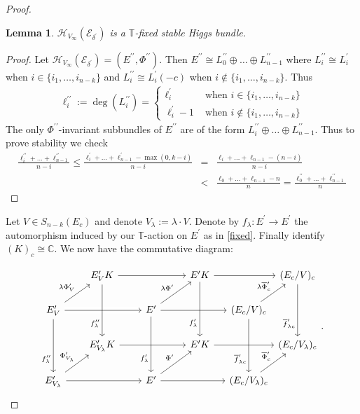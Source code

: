 \documentclass[12pt]{article}
\numberwithin{equation}{section}
\newtheorem{lemma}[theorem]{Lemma}
\theoremstyle{remark}
\theoremstyle{definition}
\numberwithin{theorem}{section}
\def\beq{\begin{eqnarray}}
\def\eeq{\end{eqnarray}}
\def\bes{\begin{eqnarray*}}
\def\ees{\end{eqnarray*}}
\def\calE{{\mathcal E}}
\def\C{\mathbb{C}}
\def\calH{\mathcal{H}}
\newcommand{\T}{{\mathbb{T}}}
\def\d{{{\delta}}}
\renewcommand{\1}{\mathbbm{1}}
\begin{document}
\begin{proof}
	\begin{lemma} $\calH_{V_\infty}(\calE_{\d^\prime})$ is a $\T$-fixed stable Higgs bundle. 
	\end{lemma}
	\begin{proof} Let $\calH_{V_\infty}(\calE_{\d^\prime})=(E^{\prime\prime},\Phi^{\prime\prime})$. Then $E^{\prime\prime}\cong L_0^{\prime\prime}\oplus \dots \oplus L_{{n-1}}^{\prime\prime}$ where $L_i^{\prime\prime}\cong L_i^\prime$ when $i\in\{i_1,\dots,i_{n-k}\}$ and $L_i^{\prime\prime}\cong L_i^\prime(-c)$ when $i\notin\{i_1,\dots,i_{n-k}\}$. Thus 
		\beq\label{lpp}  \ell_i^{\prime\prime}:=\deg(L_i^{\prime\prime} ) =\left\{ \begin{array}{cc} \ell_i^\prime & \mbox{ when } i\in\{i_1,\dots,i_{n-k}\} \\ \ell_i^\prime-1 & \mbox{ when } i\notin\{i_1,\dots,i_{n-k}\}  
		\end{array} 
		\right. \eeq
		The only $\Phi^{\prime\prime}$-invariant subbundles of $E^{\prime\prime}$ are of the form $L_i^{\prime\prime}\oplus \dots \oplus L_{n-1}^{\prime\prime}$. Thus to prove stability we check \bes  \frac{\ell^{\prime\prime}_i+\dots+\ell^{\prime\prime}_{n-1}}{n-i}\leq\frac{\ell^\prime_i+\dots+\ell^\prime_{n-1}-\max(0,k-i)}{n-i}&=&\frac{\ell_i+\dots+\ell_{n-1}-(n-i)}{n-i}  \\
		&<&  \frac{\ell_0+\dots+\ell_{n-1}-n}{n}=
		\frac{\ell^{\prime\prime}_0+\dots+\ell^{\prime\prime}_{n-1}}{n}
		\ees
		
	\end{proof}
	
	Let $V\in S_{n-k}(E_c)$ and denote $V_\lambda:=\lambda\cdot V$. Denote by $f_\lambda:E^\prime\to E^\prime$ the automorphism induced by our $\T$-action on $E^\prime$ as in \eqref{fixed}. Finally identify  $(K)_c\cong \C$.   We now have the commutative diagram: 
	
	
	$$\begin{tikzcd}[column sep={between origins,5em}]
	& E^{\prime}_VK \ar{rr}
	& & E^\prime K \ar{rr} & & (E_c/V)_c \\
	E^{\prime}_V \ar{ur}{\lambda \Phi^{\prime}_V} \ar[crossing over]{rr} \ar{dd}[swap,near end]{f^{\prime\prime}_\lambda} 
	& & E^{\prime} \ar{ur}{\lambda \Phi^\prime}\ar{rr} & & (E_c/V)_c \ar{ur}{\lambda \overline{\Phi}^\prime_c}& \\
	& E^{\prime}_{V_\lambda}K \ar[leftarrow]{uu}[near start]{f^{\prime\prime}_\lambda}  \ar{rr} \ar[leftarrow, swap]{dl}{  \Phi^{\prime}_{V_\lambda} }
	& & E^\prime K \ar[leftarrow, swap]{dl}{ \Phi^\prime} \ar{rr} \ar[leftarrow, near start]{uu}{f^\prime_\lambda}& & (E_c/V_\lambda)_c \ar[leftarrow,near start]{uu}{\overline{f}^\prime_{\lambda c}}\\
	E^\prime_{V_\lambda} \ar{rr} & & E^\prime \ar[leftarrow, near start]{uu}{f^\prime_\lambda} \ar{rr} & & (E_c/V_\lambda)_c \ar[leftarrow, near start]{uu}{\overline{f}^\prime_{\lambda c}} \ar{ur}{ {\overline{\Phi}^\prime_c}} &
	\end{tikzcd}.$$
	

\end{proof}
\end{document}
